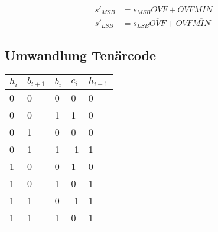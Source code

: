 \begin{boxleft}
\\
\end{boxleft}\begin{boxrightshaded}
\begin{align*}
s'_{MSB}&=s_{MSB}\overline{\mathit{OVF}}+\mathit{OVF}\mathit{MIN}\\
s'_{LSB}&=s_{LSB}\overline{\mathit{OVF}}+\mathit{OVF}\overline{{MIN}}
\end{align*}
\end{boxrightshaded}

\subsection{Umwandlung Tenärcode}

\begin{tabular}{lll|ll}
$h_i$& $b_{i+1}$&$b_i$&$c_i$&$h_{i+1}$\\
\hline
0&0&0&0&0\\
0&0&1&1&0\\
0&1&0&0&0\\
0&1&1&-1&1\\
1&0&0&1&0\\
1&0&1&0&1\\
1&1&0&-1&1\\
1&1&1&0&1
\end{tabular}
